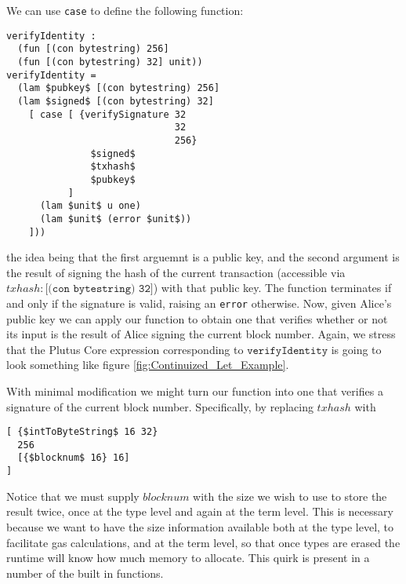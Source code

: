 \documentclass[../main.tex]{subfiles}
\begin{document}
We can use \texttt{case} to define the following function:
\begin{lstlisting}[basicstyle=\ttfamily,mathescape]
verifyIdentity :
  (fun [(con bytestring) 256]
  (fun [(con bytestring) 32] unit))
verifyIdentity =
  (lam $pubkey$ [(con bytestring) 256]                  
  (lam $signed$ [(con bytestring) 32]
    [ case [ {verifySignature 32 
                              32
                              256}
               $signed$
               $txhash$
               $pubkey$
           ]
      (lam $unit$ u one)
      (lam $unit$ (error $unit$))
    ]))
\end{lstlisting}
the idea being that the first arguemnt is a public key, and the second argument is the result of signing the hash of the current transaction (accessible via $txhash : \texttt{[(con bytestring) 32]}$) with that public key. The function terminates if and only if the signature is valid, raising an \texttt{error} otherwise. Now, given Alice's public key we can apply our function to obtain one that verifies whether or not its input is the result of Alice signing the current block number. Again, we stress that the Plutus Core expression corresponding to $\texttt{verifyIdentity}$ is going to look something like figure \ref{fig:Continuized_Let_Example}.

With minimal modification we might turn our function into one that verifies a signature of the current block number. Specifically, by replacing $txhash$ with
\begin{lstlisting}[basicstyle=\ttfamily,mathescape]
[ {$intToByteString$ 16 32}
  256
  [{$blocknum$ 16} 16]
]
\end{lstlisting}
Notice that we must supply $blocknum$ with the size we wish to use to store the result twice, once at the type level and again at the term level. This is necessary because we want to have the size information available both at the type level, to facilitate gas calculations, and at the term level, so that once types are erased the runtime will know how much memory to allocate. This quirk is present in a number of the built in functions. 
\end{document}
